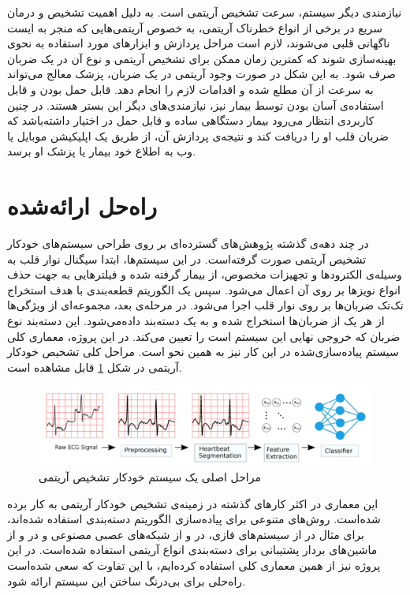 نیازمندی دیگر سیستم، سرعت تشخیص آریتمی است. به دلیل اهمیت تشخیص و درمان سریع در برخی از انواع خطرناک آریتمی، به خصوص آریتمی‌هایی که منجر به ایست ناگهانی قلبی می‌شوند، لازم است مراحل پردازش و ابزارهای مورد استفاده به نحوی بهینه‌سازی شوند که کمترین زمان ممکن برای تشخیص آریتمی و نوع آن در یک ضربان صرف شود. به این شکل در صورت وجود آریتمی در یک ضربان، پزشک معالج می‌تواند به سرعت از آن مطلع شده و اقدامات لازم را انجام دهد.
قابل حمل بودن و قابل استفاده‌ی آسان بودن توسط بیمار نیز، نیازمندی‌های دیگر این بستر هستند. در چنین کاربردی انتظار می‌رود بیمار دستگاهی ساده و قابل حمل در اختیار داشته‌باشد که ضربان قلب او را دریافت کند و نتیجه‌ی پردازش آن، از طریق یک اپلیکیشن موبایل یا وب به اطلاع خود بیمار یا پزشک او برسد.

\section{راه‌حل ارائه‌شده}

در چند دهه‌ی گذشته پژوهش‌های گسترده‌ای بر روی طراحی سیستم‌های خودکار تشخیص آریتمی صورت گرفته‌است. در این سیستم‌ها، ابتدا سیگنال نوار قلب به وسیله‌ی الکترودها و تجهیزات مخصوص، از بیمار گرفته شده و فیلترهایی به جهت حذف انواع نویزها بر روی آن اعمال می‌شود. سپس یک الگوریتم قطعه‌بندی   با هدف استخراج تک‌تک ضربان‌ها بر روی نوار قلب اجرا می‌شود. در مرحله‌ی بعد، مجموعه‌ای از ویژگی‌ها از هر یک از ضربان‌ها استخراج شده و به یک دسته‌بند  داده‌می‌شود. این دسته‌بند نوع ضربان که خروجی نهایی این سیستم است را تعیین می‌کند. در این پروژه، معماری کلی سیستم پیاد‌ه‌سازی‌شده در این کار نیز به همین نحو است. مراحل کلی تشخیص خودکار آریتمی در شکل \ref{fig:classifierPicture} قابل مشاهده است.
 
\begin{figure}[!htb]
\centering
\includegraphics[width=15cm]{Figures/classifier.png}
\caption{مراحل اصلی یک سیستم خودکار تشخیص آریتمی\cite{Mondejar}}
\label{fig:classifierPicture}
\end{figure}
این معماری در اکثر کارهای گذشته در زمینه‌ی تشخیص خودکار آریتمی به کار برده شده‌است. روش‌های متنوعی برای پیاده‌سازی الگوریتم دسته‌بندی استفاده شده‌اند، برای مثال در \cite{Exarchos2007} از سیستم‌های فازی، در \cite{deChazal2004} و \cite{Llamedo2011} از شبکه‌‌های عصبی مصنوعی و در \cite{Zhang2005} و \cite{Bazi2013} از ماشین‌های بردار پشتیبانی برای دسته‌بندی انواع آریتمی استفاده شده‌است. در این پروژه نیز از همین معماری کلی استفاده کرده‌ایم، با این تفاوت که سعی شده‌است راه‌حلی برای بی‌درنگ ساختن این سیستم ارائه شود. 

